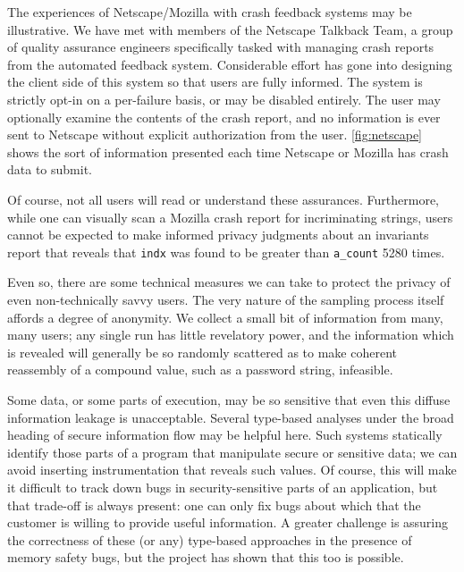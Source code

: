 The experiences of Netscape/Mozilla with crash feedback systems may be
illustrative.  We have met with members of the Netscape Talkback Team,
a group of quality assurance engineers specifically tasked with
managing crash reports from the automated feedback system.
Considerable effort has gone into designing the client side of this
system so that users are fully informed.  The system is strictly
opt-in on a per-failure basis, or may be disabled entirely.  The user
may optionally examine the contents of the crash report, and no
information is ever sent to Netscape without explicit authorization
from the user.  \autoref{fig:netscape} shows the sort of information
presented each time Netscape or Mozilla has crash data to submit.

Of course, not all users will read or understand these assurances.
Furthermore, while one can visually scan a Mozilla crash report for
incriminating strings, users cannot be expected to make informed
privacy judgments about an invariants report that reveals that
\texttt{indx} was found to be greater than \texttt{a\_count} 5280
times.

Even so, there are some technical measures we can take to protect the
privacy of even non-technically savvy users.  The very nature of the
sampling process itself affords a degree of anonymity.  We collect a
small bit of information from many, many users; any single run has
little revelatory power, and the information which is revealed will
generally be so randomly scattered as to make coherent reassembly of a
compound value, such as a password string, infeasible.

Some data, or some parts of execution, may be so sensitive that even
this diffuse information leakage is unacceptable.  Several type-based
analyses under the broad heading of secure information flow
\cite{volpano96:sound,1997:tapsoft:volpano,ZdZhNyMy2001} may be
helpful here.  Such systems statically identify those parts of a
program that manipulate secure or sensitive data; we can avoid
inserting instrumentation that reveals such values.  Of course, this
will make it difficult to track down bugs in security-sensitive parts
of an application, but that trade-off is always present: one can only
fix bugs about which that the customer is willing to provide useful
information.  A greater challenge is assuring the correctness of these
(or any) type-based approaches in the presence of memory safety bugs,
but the \CCured project has shown that this too is possible.

